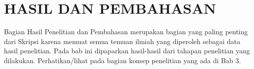\chapter{HASIL DAN PEMBAHASAN}

\begin{isi}
Bagian Hasil Penelitian dan Pembahasan merupakan bagian yang
paling penting dari Skripsi karena memuat semua temuan ilmiah
yang diperoleh sebagai data hasil penelitian. Pada bab ini
dipaparkan hasil-hasil dari tahapan penelitian yang dilakukan.
Perhatikan/lihat pada bagian konsep penelitian yang ada di Bab 3.
\end{isi}
